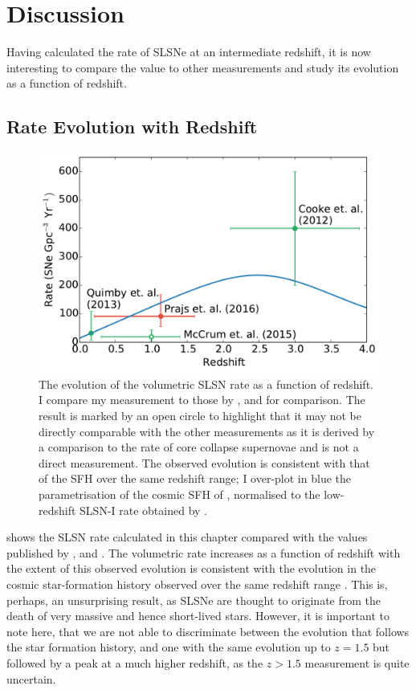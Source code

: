\section{Discussion}
Having calculated the rate of SLSNe at an intermediate redshift, it is now interesting to compare the value to other measurements and study its evolution as a function of redshift.

\subsection{Rate Evolution with Redshift}
\label{sec:Discussion}
\begin{figure}
\includegraphics[scale=0.5]{Figures/Chapter3/rate}
\caption{The evolution of the volumetric SLSN rate as a function of redshift. I compare my measurement to those by \citet{Cookie2013}, \citet{Quimby2014} and \citet{McCrum2015} for comparison. The \citet{McCrum2015} result is marked by an open circle to highlight that it may not be directly comparable with the other measurements as it is derived by a comparison to the rate of core collapse supernovae and is not a direct measurement. The observed evolution is consistent with that of the SFH over the same redshift range; I over-plot in blue the parametrisation of the cosmic SFH of \citet{2006ApJ...651..142H}, normalised to the low-redshift SLSN-I rate obtained by \citet{Quimby2014}.}
\label{fig:rate}
\end{figure}

 shows the SLSN rate calculated in this chapter compared with the values published by \citet{Cookie2013}, \citet{Quimby2014} and \citet{McCrum2015}. The volumetric rate increases as a function of redshift with the extent of this observed evolution is consistent with the evolution in the cosmic star-formation history observed over the same redshift range \citep{2006ApJ...651..142H}. This is, perhaps, an unsurprising result, as SLSNe are thought to originate from the death of very massive and hence short-lived stars. However, it is important to note here, that we are not able to discriminate between the evolution that follows the star formation history, and one with the same evolution up to $z=1.5$ but followed by a peak at a much higher redshift, as the $z>1.5$ measurement is quite uncertain.

